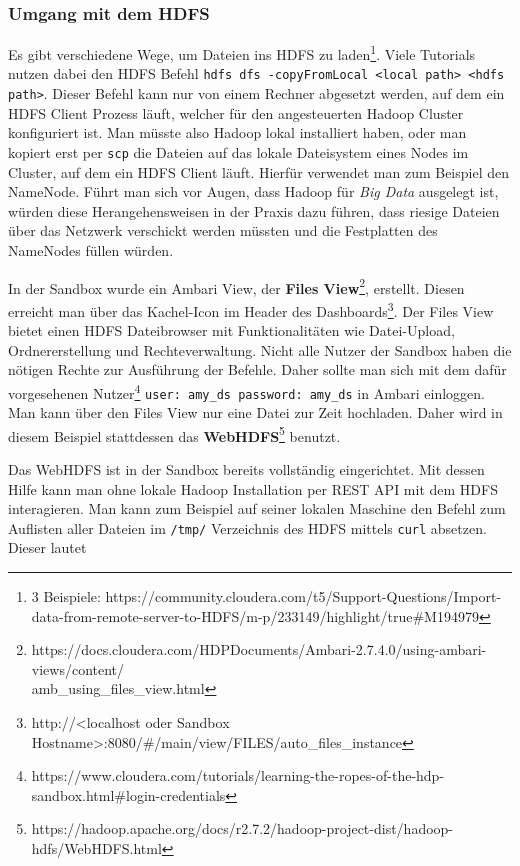 \subsubsection*{Umgang mit dem HDFS}
\label{chap:fund sec:core sub:handson hdfs}
Es gibt verschiedene Wege, um Dateien ins HDFS zu laden\footnote{3 Beispiele: https://community.cloudera.com/t5/Support-Questions/Import-data-from-remote-server-to-HDFS/m-p/233149/highlight/true\#M194979}. Viele Tutorials nutzen dabei den HDFS Befehl \verb|hdfs dfs -copyFromLocal <local path> <hdfs path>|. Dieser Befehl kann nur von einem Rechner abgesetzt werden, auf dem ein HDFS Client Prozess läuft, welcher für den angesteuerten Hadoop Cluster konfiguriert ist. Man müsste also Hadoop lokal installiert haben, oder man kopiert erst per \verb|scp| die Dateien auf das lokale Dateisystem eines Nodes im Cluster, auf dem ein HDFS Client läuft. Hierfür verwendet man zum Beispiel den NameNode. Führt man sich vor Augen, dass Hadoop für \textit{Big Data} ausgelegt ist, würden diese Herangehensweisen in der Praxis dazu führen, dass riesige Dateien über das Netzwerk verschickt werden müssten und die Festplatten des NameNodes füllen würden.
\par
In der Sandbox wurde ein Ambari View, der \textbf{Files View}\footnote{https://docs.cloudera.com/HDPDocuments/Ambari-2.7.4.0/using-ambari-views/content/\\amb\_using\_files\_view.html}, erstellt. Diesen erreicht man über das Kachel-Icon im Header des Dashboards\footnote{http://<localhost oder Sandbox Hostname>:8080/\#/main/view/FILES/auto\_files\_instance}. Der Files View bietet einen HDFS Dateibrowser mit Funktionalitäten wie Datei-Upload, Ordnererstellung und Rechteverwaltung. Nicht alle Nutzer der Sandbox haben die nötigen Rechte zur Ausführung der Befehle. Daher sollte man sich mit dem dafür vorgesehenen Nutzer\footnote{https://www.cloudera.com/tutorials/learning-the-ropes-of-the-hdp-sandbox.html\#login-credentials} \verb|user: amy_ds password: amy_ds| in Ambari einloggen. Man kann über den Files View nur eine Datei zur Zeit hochladen. Daher wird in diesem Beispiel stattdessen das \textbf{WebHDFS}\footnote{https://hadoop.apache.org/docs/r2.7.2/hadoop-project-dist/hadoop-hdfs/WebHDFS.html} benutzt.
\par
Das WebHDFS ist in der Sandbox bereits vollständig eingerichtet. Mit dessen Hilfe kann man ohne lokale Hadoop Installation per REST API mit dem HDFS interagieren. Man kann zum Beispiel auf seiner lokalen Maschine den Befehl zum Auflisten aller Dateien im \verb|/tmp/| Verzeichnis des HDFS mittels \verb|curl| absetzen. Dieser lautet 
